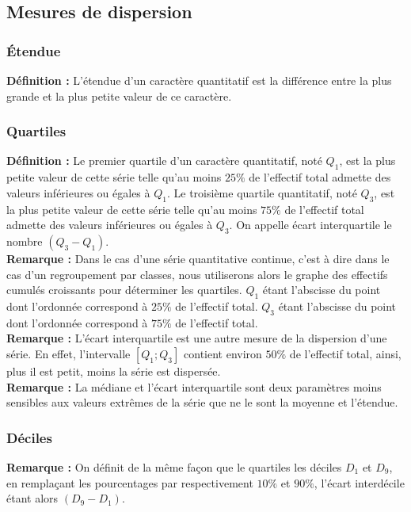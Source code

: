 \documentclass[a4paper,titlepage]{article}
\begin{document}
    \subsection{Mesures de dispersion}
        \subsubsection{Étendue}
            \textbf{Définition :} L’étendue d’un caractère quantitatif est la différence entre la plus grande et la plus petite valeur de ce caractère.
        \subsubsection{Quartiles}
            \textbf{Définition :} Le premier quartile d’un caractère quantitatif, noté $Q_{1}$, est la plus petite valeur de cette série telle qu’au moins $25\%$ de l’effectif total admette des valeurs inférieures ou égales à $Q_{1}$. Le troisième quartile quantitatif, noté $Q_{3}$, est la plus petite valeur de cette série telle qu’au moins $75\%$ de l’effectif total admette des valeurs inférieures ou égales à $Q_{3}$. On appelle écart interquartile le nombre $\left(Q_{3}-Q_{1}\right)$.
            \\
            \textbf{Remarque :} Dans le cas d’une série quantitative continue, c’est à dire dans le cas d’un regroupement par classes, nous utiliserons alors le graphe des effectifs cumulés croissants pour déterminer les quartiles. $Q_{1}$ étant l’abscisse du point dont l’ordonnée correspond à $25\%$ de l’effectif total. $Q_{3}$ étant l’abscisse du point dont l’ordonnée correspond à $75\%$ de l’effectif total.
            \\
            \textbf{Remarque :} L’écart interquartile est une autre mesure de la dispersion d’une série. En effet, l’intervalle $\left[Q_{1};Q_{3}\right]$ contient environ $50\%$ de l’effectif total, ainsi, plus il est petit, moins la série est dispersée.
            \\
            \textbf{Remarque :} La médiane et l’écart interquartile sont deux paramètres moins sensibles aux valeurs extrêmes de la série que ne le sont la moyenne et l’étendue.
        \subsubsection{Déciles}
            \textbf{Remarque :} On définit de la même façon que le quartiles les déciles $D_{1}$ et $D_{9}$, en remplaçant les pourcentages par respectivement $10\%$ et $90\%$, l’écart interdécile étant alors $\left(D_{9}-D_{1}\right)$.
\end{document}
